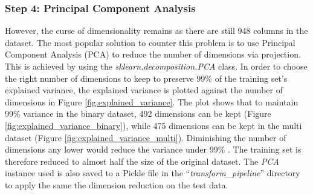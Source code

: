 \documentclass[letterpaper,12pt]{article}
\begin{document}
\subsubsection{Step 4: Principal Component Analysis}
\label{sec:pca}

However, the curse of dimensionality remains as there are still 948 columns in the dataset. The most popular solution to counter this problem is to use Principal Component Analysis (PCA) to reduce the number of dimensions via projection. This is achieved by using the \textit{sklearn.decomposition.PCA} class. In order to choose the right number of dimensions to keep to preserve 99\% of the training set's explained variance, the explained variance is plotted against the number of dimensions in Figure \ref{fig:explained_variance}. The plot shows that to maintain 99\% variance in the binary dataset, 492 dimensions can be kept (Figure \ref{fig:explained_variance_binary}), while 475 dimensions can be kept in the multi dataset (Figure \ref{fig:explained_variance_multi}). Diminishing the number of dimensions any lower would reduce the variance under 99\% \cite{Geron2019}. The training set is therefore reduced to almost half the size of the original dataset. The \textit{PCA} instance used is also saved to a Pickle file in the ``\textit{transform\_pipeline}'' directory to apply the same the dimension reduction on the test data.
\end{document}
